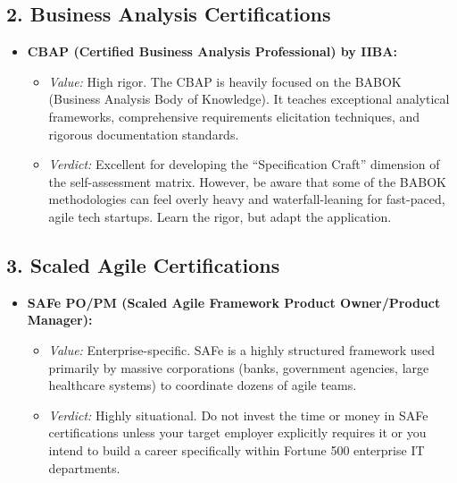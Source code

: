 \subsection{2. Business Analysis
Certifications}\label{business-analysis-certifications}

\begin{itemize}
\tightlist
\item
  \textbf{CBAP (Certified Business Analysis Professional) by IIBA:}

  \begin{itemize}
  \tightlist
  \item
    \emph{Value:} High rigor. The CBAP is heavily focused on the BABOK
    (Business Analysis Body of Knowledge). It teaches exceptional
    analytical frameworks, comprehensive requirements elicitation
    techniques, and rigorous documentation standards.
  \item
    \emph{Verdict:} Excellent for developing the ``Specification Craft''
    dimension of the self-assessment matrix. However, be aware that some
    of the BABOK methodologies can feel overly heavy and
    waterfall-leaning for fast-paced, agile tech startups. Learn the
    rigor, but adapt the application.
  \end{itemize}
\end{itemize}

\subsection{3. Scaled Agile
Certifications}\label{scaled-agile-certifications}

\begin{itemize}
\tightlist
\item
  \textbf{SAFe PO/PM (Scaled Agile Framework Product Owner/Product
  Manager):}

  \begin{itemize}
  \tightlist
  \item
    \emph{Value:} Enterprise-specific. SAFe is a highly structured
    framework used primarily by massive corporations (banks, government
    agencies, large healthcare systems) to coordinate dozens of agile
    teams.
  \item
    \emph{Verdict:} Highly situational. Do not invest the time or money
    in SAFe certifications unless your target employer explicitly
    requires it or you intend to build a career specifically within
    Fortune 500 enterprise IT departments.
  \end{itemize}
\end{itemize}

